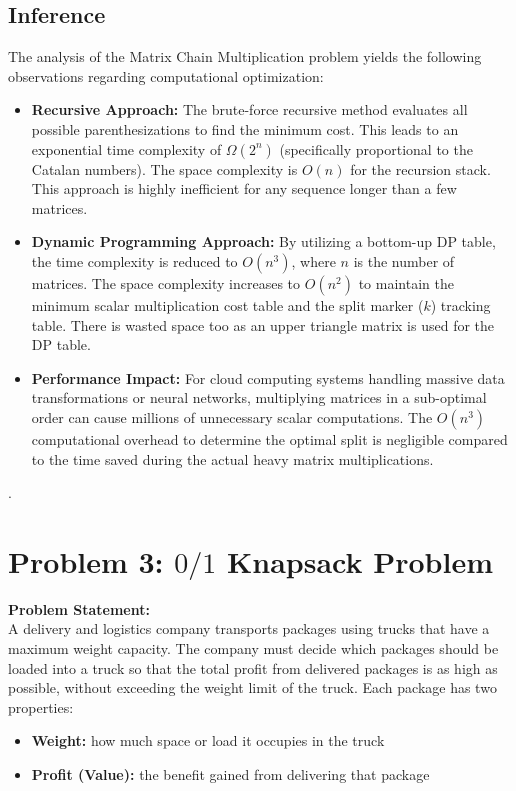 \documentclass[a4paper,12pt]{article}
\begin{document}
\newpage
\subsection*{Inference}
The analysis of the Matrix Chain Multiplication problem yields the following observations regarding computational optimization:
\begin{itemize}
    \item \textbf{Recursive Approach:} The brute-force recursive method evaluates all possible parenthesizations to find the minimum cost. This leads to an exponential time complexity of $\Omega(2^n)$ (specifically proportional to the Catalan numbers). The space complexity is $O(n)$ for the recursion stack. This approach is highly inefficient for any sequence longer than a few matrices.
    \item \textbf{Dynamic Programming Approach:} By utilizing a bottom-up DP table, the time complexity is reduced to $O(n^3)$, where $n$ is the number of matrices. The space complexity increases to $O(n^2)$ to maintain the minimum scalar multiplication cost table and the split marker ($k$) tracking table. There is wasted space too as an upper triangle matrix is used for the DP table.
    \item \textbf{Performance Impact:} For cloud computing systems handling massive data transformations or neural networks, multiplying matrices in a sub-optimal order can cause millions of unnecessary scalar computations. The $O(n^3)$ computational overhead to determine the optimal split is negligible compared to the time saved during the actual heavy matrix multiplications.
\end{itemize}.

\newpage

\section*{Problem 3: $0/1$ Knapsack Problem}
\textbf{Problem Statement:}\\
A delivery and logistics company transports packages using trucks that have a maximum weight capacity. The company must decide which packages should be loaded into a truck so that the total profit from delivered packages is as high as possible, without exceeding the weight limit of the truck. Each package has two properties:
\begin{itemize}
    \item \textbf{Weight:} how much space or load it occupies in the truck
    \item \textbf{Profit (Value):} the benefit gained from delivering that package
\end{itemize}
\end{document}
